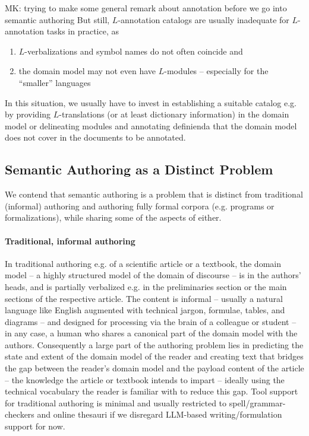 \documentclass{llncs}
\begin{document}
\begin{newpart}{MK: trying to make some general remark about annotation before we go into
    semantic authoring}
But still, $L$-annotation catalogs are usually inadequate for $L$-annotation tasks in
practice, as
\begin{enumerate}[\em i\rm)]
\item $L$-verbalizations and symbol names do not often coincide and
\item the domain model may not even have $L$-modules -- especially for the ``smaller''
  languages
\end{enumerate}
 In this situation, we usually have to invest in
establishing a suitable catalog e.g. by providing $L$-translations (or at least dictionary
information) in the domain model or delineating modules and annotating definienda that the
domain model does not cover in the documents to be annotated.
\end{newpart}

\subsection{Semantic Authoring as a Distinct Problem}
We contend that semantic authoring is a problem that is distinct from traditional
(informal) authoring and authoring fully formal corpora (e.g. programs or formalizations),
while sharing some of the aspects of either.

\paragraph{Traditional, informal authoring}
In traditional authoring e.g. of a scientific article or a textbook, the domain model -- a
highly structured model of the domain of discourse -- is in the authors' heads, and is
partially verbalized e.g. in the preliminaries section or the main sections of the
respective article. The content is informal -- usually a natural language like English
augmented with technical jargon, formulae, tables, and diagrams -- and designed for
processing via the brain of a colleague or student -- in any case, a human who shares a
canonical part of the domain model with the authors. Consequently a large part of the authoring problem lies in
predicting the state and extent of the domain model of the reader and creating text that
bridges the gap between the reader's domain model and the payload content of the article
-- the knowledge the article or textbook intends to impart -- ideally using the technical
vocabulary the reader is familiar with to reduce this gap. Tool support for traditional
authoring is minimal and usually restricted to spell/grammar-checkers and online thesauri
if we disregard LLM-based writing/formulation support for now.
\end{document}
